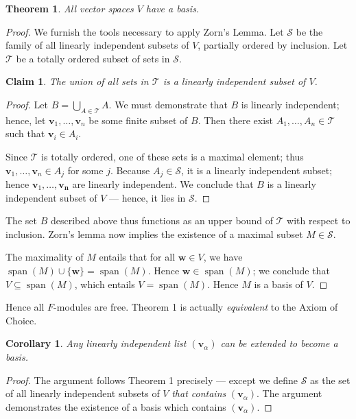 \documentclass[11pt]{article}
\newtheorem{theorem}{Theorem}
\newtheorem{corollary}{Corollary}
\newtheorem{claim}{Claim}
\renewcommand{\vec}[1]{\mathbf{#1}}
\newcommand{\spn}{\operatorname{span}}
\begin{document}
\begin{adjustwidth}{0.5cm}{}
  \begin{theorem}
    All vector spaces $V$ have a basis.
  \end{theorem}
  \begin{proof}
    We furnish the tools necessary to apply Zorn's Lemma. Let $\mathcal{S}$ be the family of all linearly independent subsets of $V$, partially ordered by inclusion. Let $\mathcal{T}$ be a totally ordered subset of sets in $\mathcal{S}$.
    \begin{adjustwidth}{0.5cm}{}
      \begin{claim}
        The union of all sets in $\mathcal{T}$ is a linearly independent subset of $V$.
      \end{claim}
      \begin{proof}\renewcommand{\qedsymbol}{}
        Let $B = \bigcup_{A \in \mathcal{T}} A$. We must demonstrate that $B$ is linearly independent; hence, let $\vec{v}_{1}, \ldots, \vec{v}_{n}$ be some finite subset of $B$. Then there exist $A_{1}, \ldots, A_{n} \in \mathcal{T}$ such that $\vec{v}_{i} \in A_{i}$. 

        Since $\mathcal{T}$ is totally ordered, one of these sets is a maximal element; thus $\vec{v}_{1}, \ldots, \vec{v}_{n} \in A_{j}$ for some $j$. Because $A_{j} \in \mathcal{S}$, it is a linearly independent subset; hence $\vec{v}_{1}, \ldots, \vec{v_{n}}$ are linearly independent. We conclude that $B$ is a linearly independent subset of $V$ --- hence, it lies in $\mathcal{S}$.
      \end{proof}
    \end{adjustwidth}
    The set $B$ described above thus functions as an upper bound of $\mathcal{T}$ with respect to inclusion. Zorn's lemma now implies the existence of a maximal subset $M \in \mathcal{S}$.

    The maximality of $M$ entails that for all $\vec{w} \in V$, we have $\spn(M) \cup \{ \vec{w} \} = \spn(M)$. Hence $\vec{w} \in \spn(M)$; we conclude that $V \subseteq \spn(M)$, which entails $V = \spn(M)$. Hence $M$ is a basis of $V$.
  \end{proof}
\end{adjustwidth}

Hence all $F$-modules are free. Theorem 1 is actually \textit{equivalent} to the Axiom of Choice.

\begin{adjustwidth}{0.5cm}{}
  \begin{corollary}
    Any linearly independent list $(\vec{v}_{\alpha})$ can be extended to become a basis.
  \end{corollary}
  \begin{proof}
    The argument follows Theorem 1 precisely --- except we define $\mathcal{S}$ as the set of all linearly independent subsets of $V$ \textit{that contains} $(\vec{v}_{\alpha})$. The argument demonstrates the existence of a basis which contains $(\vec{v}_{\alpha})$.
  \end{proof}
\end{adjustwidth}
\end{document}
